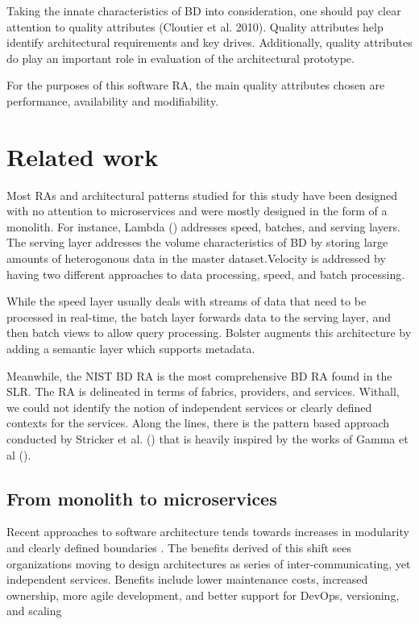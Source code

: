 \documentclass[conference]{IEEEtran}
\begin{document}
Taking the innate characteristics of BD into consideration, one should pay clear attention to quality attributes (Cloutier et al. 2010). Quality attributes help identify architectural requirements and key drives. Additionally, quality attributes do play an important role in evaluation of the architectural prototype.

For the purposes of this software RA, the main quality attributes chosen are performance, availability and modifiability.

\section{Related work}

Most RAs and architectural patterns studied for this study have been designed with no attention to microservices and were mostly designed in the form of a monolith. For instance, Lambda (\cite{Villari}) addresses speed, batches, and serving layers. The serving layer addresses the volume characteristics of BD by storing large amounts of heterogonous data in the master dataset.Velocity is addressed by having two different approaches to data processing, speed, and batch processing.

While the speed layer usually deals with streams of data that need to be processed in real-time, the batch layer forwards data to the serving layer, and then batch views to allow query processing. Bolster \cite{Nadal} augments this architecture by adding a semantic layer which supports metadata.

Meanwhile, the NIST BD RA \cite{Chang} is the most comprehensive BD RA found in the SLR. The RA is delineated in terms of fabrics, providers, and services. Withall, we could not identify the notion of independent services or clearly defined contexts for the services. Along the lines, there is the pattern based approach conducted by Stricker et al. (\cite{Stricker}) that is heavily inspired by the works of Gamma et al (\cite{Gamma}).

\subsection{From monolith to microservices}

Recent approaches to software architecture tends towards increases in modularity and clearly defined boundaries \cite{Jamshidi}. The benefits derived of this shift sees organizations moving to design architectures as series of inter-communicating, yet independent services. Benefits include lower maintenance costs, increased ownership, more agile development, and better support for DevOps, versioning, and scaling \cite{Fritzsch}
\end{document}
